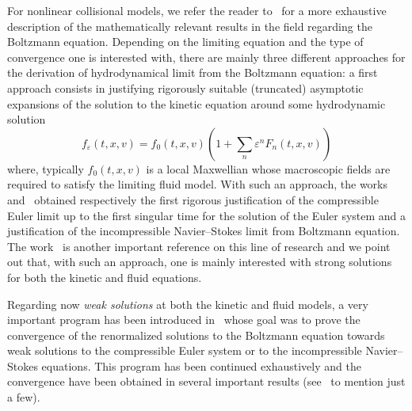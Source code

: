 \documentclass[AHL,Unicode,longabstracts,published]{cedram}
\newcommand*\eps{{\varepsilon}}
\begin{document}
For nonlinear collisional models, we refer the reader to~\cite{golse,SR} for a more exhaustive description of the mathematically relevant results in the field regarding the Boltzmann equation. Depending on the limiting equation and the type of convergence one is interested with, there are mainly three different approaches for the derivation of hydrodynamical limit from the Boltzmann equation: a first approach consists in justifying rigorously suitable (truncated) asymptotic expansions of the solution to the kinetic equation around some hydrodynamic solution
\begin{equation*}\label{eq:C-E}
f_{\eps}(t,x,v)=f_{0}(t,x,v)\left(1+\sum_{n}\eps^{n}F_{n}(t,x,v)\right)
\end{equation*}
where, typically $f_{0}(t,x,v)$ is a local Maxwellian whose macroscopic fields are required to satisfy the limiting fluid model. With such an approach, the works~\cite{caflisch} and~\cite{demasi} obtained respectively the first rigorous justification of the compressible Euler limit up to the first singular time for the solution of the Euler system and a justification of the incompressible Navier--Stokes limit from Boltzmann equation. The work~\cite{G2006} is another important reference on this line of research and we point out that, with such an approach, one is mainly interested with strong solutions for both the kinetic and fluid equations.

Regarding now \emph{weak solutions} at both the kinetic and fluid models, a very important program has been introduced in~\cite{BaGoLe1,BaGoLe2} whose goal was to prove the convergence of the renormalized solutions to the Boltzmann equation towards weak solutions to the compressible Euler system or to the incompressible Navier--Stokes equations. This program has been continued exhaustively and the convergence have been obtained in several important results (see~\cite{golseSR,golseSR1,jiang-masm,lever,lions-masm1,lions-masm2} to mention just a few).
\end{document}
